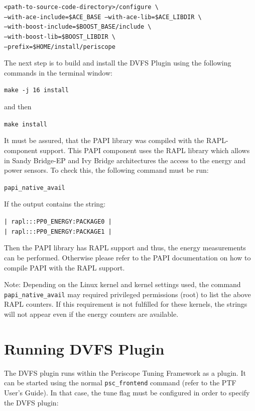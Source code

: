 \documentclass[11pt,a4paper, oneside]{book} %
\begin{document}
  \texttt{<path-to-source-code-directory>/configure \textbackslash \\
  --with-ace-include=\$ACE\_BASE --with-ace-lib=\$ACE\_LIBDIR \textbackslash \\
  --with-boost-include=\$BOOST\_BASE/include \textbackslash \\
  --with-boost-lib=\$BOOST\_LIBDIR \textbackslash \\
  --prefix=\$HOME/install/periscope}

  The next step is to build and install the DVFS Plugin using the following commands in the terminal window:

  \texttt{make -j 16 install}

  and then

  \texttt{make install}

  It must be assured, that the PAPI library was compiled with the RAPL-component support. This PAPI component uses the RAPL
  library which allows in Sandy Bridge-EP and Ivy Bridge architectures the access to the energy and power sensors. To check this, the following command must be run:

  \begin{center}\texttt{papi\_native\_avail}\end{center}

  If the output contains the string:

  \begin{center}\texttt{| rapl:::PP0\_ENERGY:PACKAGE0 |\\| rapl:::PP0\_ENERGY:PACKAGE1 |\\}\end{center}

  Then the PAPI library has RAPL support and thus, the energy measurements can be performed. Otherwise please refer to the PAPI documentation on how to compile PAPI with the RAPL
  support.

 Note: Depending on the Linux kernel and kernel settings used, the command \texttt{papi\_native\_avail} may required privileged permissions (root) to list the above RAPL counters.
  If this requirement is not fulfilled for these kernels, the strings will not appear even if the energy counters are available.\\


  \section{Running DVFS Plugin}
  The DVFS plugin runs within the Periscope Tuning Framework as a plugin. It can be started using the normal \texttt{psc\_frontend} command (refer to the PTF User's Guide). In that case,
  the tune flag must be configured in order to specify the DVFS plugin:
\end{document}
